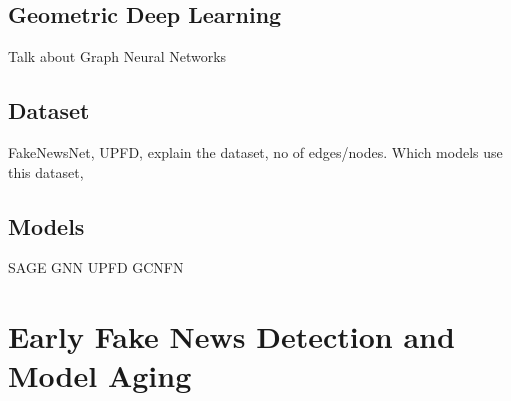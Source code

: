 \subsection{Geometric Deep Learning}
Talk about Graph Neural Networks

\subsection{Dataset}
FakeNewsNet, UPFD, explain the dataset, no of edges/nodes. Which models use this dataset,

\subsection{Models}
SAGE GNN
UPFD GCNFN

\section{Early Fake News Detection and Model Aging}